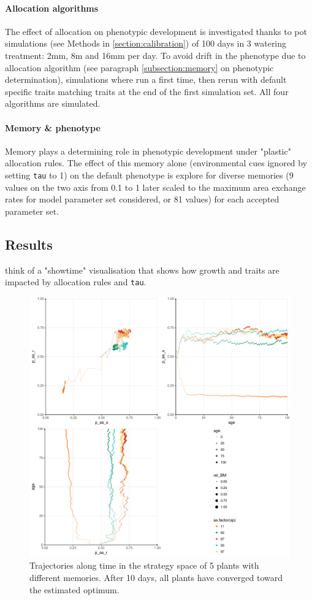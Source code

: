 \paragraph{Allocation algorithms}
The effect of allocation on phenotypic development is investigated thanks to pot simulations (see Methods in \ref{section:calibration}) of 100 days in 3 watering treatment: 2mm, 8m and 16mm per day. To avoid drift in the phenotype due to allocation algorithm (see paragraph \ref{subsection:memory} on phenotypic determination), simulations where run a first time, then rerun with default specific traits matching traits at the end of the first simulation set. All four algorithms are simulated.

\paragraph{Memory \& phenotype}
Memory plays a determining role in phenotypic development under "plastic" allocation rules. The effect of this memory alone (environmental cues ignored by setting \texttt{tau} to 1) on the default phenotype is explore for diverse memories (9 values on the two axis from 0.1 to 1 later scaled to the maximum area exchange rates for model parameter set considered, or 81 values) for each accepted parameter set.

\subsection{Results}

think of a "showtime" visualisation that shows how growth and traits are impacted by allocation rules and \texttt{tau}.


\begin{figure}\label{fig:plastic_allocation_trajectory}
\includegraphics[width = \textwidth]{./2_PP/Figures/memory_effect.pdf}
\caption{Trajectories along time in the strategy space of 5 plants with different memories. After 10 days, all plants have converged toward the estimated optimum.}
\end{figure}

